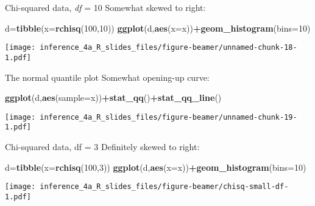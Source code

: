 \documentclass[
  ignorenonframetext,
]{beamer}
\newenvironment{Shaded}{\begin{snugshade}}{\end{snugshade}}
\newcommand{\DataTypeTok}[1]{\textcolor[rgb]{0.13,0.29,0.53}{#1}}
\newcommand{\DecValTok}[1]{\textcolor[rgb]{0.00,0.00,0.81}{#1}}
\newcommand{\KeywordTok}[1]{\textcolor[rgb]{0.13,0.29,0.53}{\textbf{#1}}}
\newcommand{\NormalTok}[1]{#1}
\newcommand{\OperatorTok}[1]{\textcolor[rgb]{0.81,0.36,0.00}{\textbf{#1}}}
\begin{document}
\begin{frame}[fragile]{Chi-squared data, \emph{df} = 10}
\protect\hypertarget{chi-squared-data-df-10}{}
Somewhat skewed to right:

\begin{Shaded}
\begin{Highlighting}[]
\NormalTok{d=}\KeywordTok{tibble}\NormalTok{(}\DataTypeTok{x=}\KeywordTok{rchisq}\NormalTok{(}\DecValTok{100}\NormalTok{,}\DecValTok{10}\NormalTok{))}
\KeywordTok{ggplot}\NormalTok{(d,}\KeywordTok{aes}\NormalTok{(}\DataTypeTok{x=}\NormalTok{x))}\OperatorTok{+}\KeywordTok{geom\_histogram}\NormalTok{(}\DataTypeTok{bins=}\DecValTok{10}\NormalTok{)}
\end{Highlighting}
\end{Shaded}

\texttt{[image: inference\_4a\_R\_slides\_files/figure-beamer/unnamed-chunk-18-1.pdf]}
\end{frame}

\begin{frame}[fragile]{The normal quantile plot}
\protect\hypertarget{the-normal-quantile-plot-2}{}
Somewhat opening-up curve:

\begin{Shaded}
\begin{Highlighting}[]
\KeywordTok{ggplot}\NormalTok{(d,}\KeywordTok{aes}\NormalTok{(}\DataTypeTok{sample=}\NormalTok{x))}\OperatorTok{+}\KeywordTok{stat\_qq}\NormalTok{()}\OperatorTok{+}\KeywordTok{stat\_qq\_line}\NormalTok{()}
\end{Highlighting}
\end{Shaded}

\texttt{[image: inference\_4a\_R\_slides\_files/figure-beamer/unnamed-chunk-19-1.pdf]}
\end{frame}

\begin{frame}[fragile]{Chi-squared data, df = 3}
\protect\hypertarget{chi-squared-data-df-3}{}
Definitely skewed to right:

\begin{Shaded}
\begin{Highlighting}[]
\NormalTok{d=}\KeywordTok{tibble}\NormalTok{(}\DataTypeTok{x=}\KeywordTok{rchisq}\NormalTok{(}\DecValTok{100}\NormalTok{,}\DecValTok{3}\NormalTok{))}
\KeywordTok{ggplot}\NormalTok{(d,}\KeywordTok{aes}\NormalTok{(}\DataTypeTok{x=}\NormalTok{x))}\OperatorTok{+}\KeywordTok{geom\_histogram}\NormalTok{(}\DataTypeTok{bins=}\DecValTok{10}\NormalTok{)}
\end{Highlighting}
\end{Shaded}

\texttt{[image: inference\_4a\_R\_slides\_files/figure-beamer/chisq-small-df-1.pdf]}
\end{frame}
\end{document}
